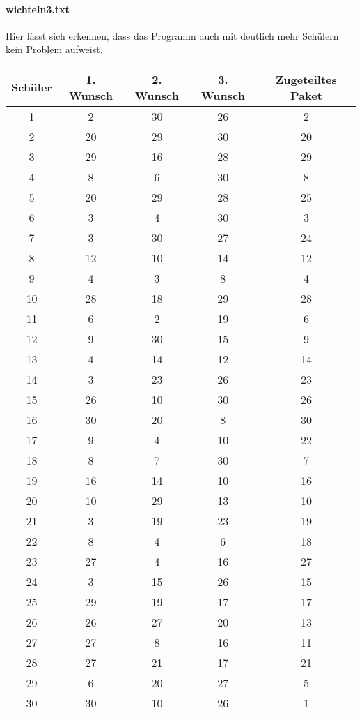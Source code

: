 \documentclass[a4paper,10pt,ngerman]{scrartcl}
\begin{document}
\paragraph{wichteln3.txt}
Hier lässt sich erkennen, dass das Programm auch mit deutlich mehr Schülern kein Problem aufweist.
\begin{longtable}[c]{c|c|c|c|c}
    Schüler & 1. Wunsch & 2. Wunsch & 3. Wunsch & Zugeteiltes Paket \\
    \hline
    \endhead
    1 & 2 & 30 & 26 & 2 \\
    2 & 20 & 29 & 30 & 20 \\
    3 & 29 & 16 & 28 & 29 \\
    4 & 8 & 6 & 30 & 8 \\
    5 & 20 & 29 & 28 & 25 \\
    6 & 3 & 4 & 30 & 3 \\
    7 & 3 & 30 & 27 & 24 \\
    8 & 12 & 10 & 14 & 12 \\
    9 & 4 & 3 & 8 & 4 \\
    10 & 28 & 18 & 29 & 28 \\
    11 & 6 & 2 & 19 & 6 \\
    12 & 9 & 30 & 15 & 9 \\
    13 & 4 & 14 & 12 & 14 \\
    14 & 3 & 23 & 26 & 23 \\
    15 & 26 & 10 & 30 & 26 \\
    16 & 30 & 20 & 8 & 30 \\
    17 & 9 & 4 & 10 & 22 \\
    18 & 8 & 7 & 30 & 7 \\
    19 & 16 & 14 & 10 & 16 \\
    20 & 10 & 29 & 13 & 10 \\
    21 & 3 & 19 & 23 & 19 \\
    22 & 8 & 4 & 6 & 18 \\
    23 & 27 & 4 & 16 & 27 \\
    24 & 3 & 15 & 26 & 15 \\
    25 & 29 & 19 & 17 & 17 \\
    26 & 26 & 27 & 20 & 13 \\
    27 & 27 & 8 & 16 & 11 \\
    28 & 27 & 21 & 17 & 21 \\
    29 & 6 & 20 & 27 & 5 \\
    30 & 30 & 10 & 26 & 1
\end{longtable}
\end{document}
